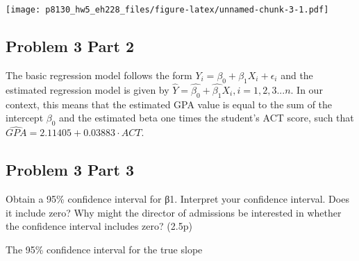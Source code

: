 \documentclass[
]{article}
\begin{document}
\texttt{[image: p8130\_hw5\_eh228\_files/figure-latex/unnamed-chunk-3-1.pdf]}

\hypertarget{problem-3-part-2}{%
\subsection{Problem 3 Part 2}\label{problem-3-part-2}}

The basic regression model follows the form
\(Y_i = \beta_0 + \beta_1X_i + \epsilon_i\) and the estimated regression
model is given by
\(\widehat{Y} = \widehat{\beta_0} + \widehat{\beta_1}X_i, i = 1,2,3...n\).
In our context, this means that the estimated GPA value is equal to the
sum of the intercept \(\beta_0\) and the estimated beta one times the
student's ACT score, such that
\(\widehat{GPA} = 2.11405 + 0.03883 \cdot ACT\).

\hypertarget{problem-3-part-3}{%
\subsection{Problem 3 Part 3}\label{problem-3-part-3}}

Obtain a 95\% confidence interval for β1. Interpret your confidence
interval. Does it include zero? Why might the director of admissions be
interested in whether the confidence interval includes zero? (2.5p)

The 95\% confidence interval for the true slope
\end{document}
